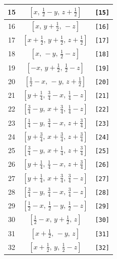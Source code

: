 \documentclass[fleqn,8pt]{jsarticle}
\begin{document}
\begin{longtable}{ccc}
15 & $\left[ x,\, \frac{1}{2} - y,\, z + \frac{1}{2} \right]$ & {\tt [15]} \\ \hline
16 & $\left[ x,\, y + \frac{1}{2},\, - z \right]$ & {\tt [16]} \\ \hline
17 & $\left[ x + \frac{1}{2},\, y + \frac{1}{2},\, z + \frac{1}{2} \right]$ & {\tt [17]} \\ \hline
18 & $\left[ x,\, - y,\, \frac{1}{2} - z \right]$ & {\tt [18]} \\ \hline
19 & $\left[ - x,\, y + \frac{1}{2},\, \frac{1}{2} - z \right]$ & {\tt [19]} \\ \hline
20 & $\left[ \frac{1}{2} - x,\, - y,\, z + \frac{1}{2} \right]$ & {\tt [20]} \\ \hline
21 & $\left[ y + \frac{1}{4},\, \frac{3}{4} - x,\, \frac{1}{4} - z \right]$ & {\tt [21]} \\ \hline
22 & $\left[ \frac{3}{4} - y,\, x + \frac{3}{4},\, \frac{1}{4} - z \right]$ & {\tt [22]} \\ \hline
23 & $\left[ \frac{1}{4} - y,\, \frac{3}{4} - x,\, z + \frac{3}{4} \right]$ & {\tt [23]} \\ \hline
24 & $\left[ y + \frac{3}{4},\, x + \frac{3}{4},\, z + \frac{3}{4} \right]$ & {\tt [24]} \\ \hline
25 & $\left[ \frac{3}{4} - y,\, x + \frac{1}{4},\, z + \frac{3}{4} \right]$ & {\tt [25]} \\ \hline
26 & $\left[ y + \frac{1}{4},\, \frac{1}{4} - x,\, z + \frac{3}{4} \right]$ & {\tt [26]} \\ \hline
27 & $\left[ y + \frac{1}{4},\, x + \frac{3}{4},\, \frac{3}{4} - z \right]$ & {\tt [27]} \\ \hline
28 & $\left[ \frac{3}{4} - y,\, \frac{3}{4} - x,\, \frac{3}{4} - z \right]$ & {\tt [28]} \\ \hline
29 & $\left[ \frac{1}{2} - x,\, \frac{1}{2} - y,\, \frac{1}{2} - z \right]$ & {\tt [29]} \\ \hline
30 & $\left[ \frac{1}{2} - x,\, y + \frac{1}{2},\, z \right]$ & {\tt [30]} \\ \hline
31 & $\left[ x + \frac{1}{2},\, - y,\, z \right]$ & {\tt [31]} \\ \hline
32 & $\left[ x + \frac{1}{2},\, y,\, \frac{1}{2} - z \right]$ & {\tt [32]} \\
\end{longtable}
\end{document}
